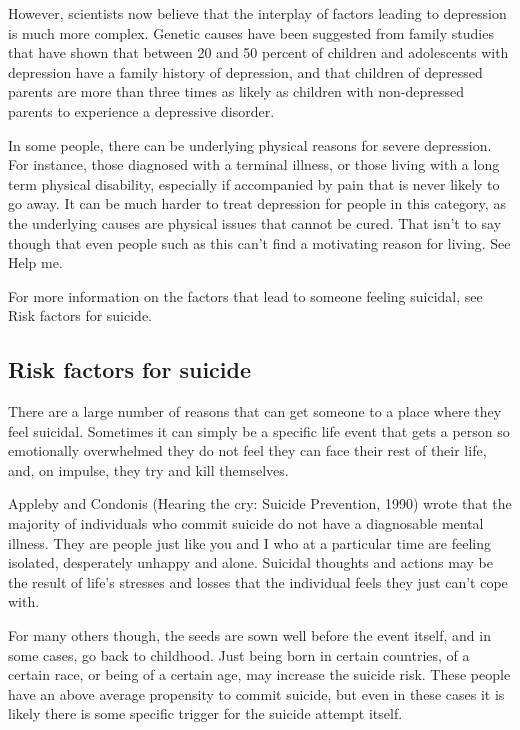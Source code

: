 \documentclass[12pt]{article}
\begin{document}
However, scientists now believe that the interplay of factors leading to depression is much more complex. Genetic causes have been suggested from family studies that have shown that between 20 and 50 percent of children and adolescents with depression have a family history of depression, and that children of depressed parents are more than three times as likely as children with non-depressed parents to experience a depressive disorder.

In some people, there can be underlying physical reasons for severe depression. For instance, those diagnosed with a terminal illness, or those living with a long term physical disability, especially if accompanied by pain that is never likely to go away. It can be much harder to treat depression for people in this category, as the underlying causes are physical issues that cannot be cured. That isn't to say though that even people such as this can't find a motivating reason for living. See Help me.

For more information on the factors that lead to someone feeling suicidal, see Risk factors for suicide.

\subsection{Risk factors for suicide}

There are a large number of reasons that can get someone to a place where they feel suicidal. Sometimes it can simply be a specific life event that gets a person so emotionally overwhelmed they do not feel they can face their rest of their life, and, on impulse, they try and kill themselves.

Appleby and Condonis (Hearing the cry: Suicide Prevention, 1990) wrote that the majority of individuals who commit suicide do not have a diagnosable mental illness. They are people just like you and I who at a particular time are feeling isolated, desperately unhappy and alone. Suicidal thoughts and actions may be the result of life's stresses and losses that the individual feels they just can't cope with.

For many others though, the seeds are sown well before the event itself, and in some cases, go back to childhood. Just being born in certain countries, of a certain race, or being of a certain age, may increase the suicide risk. These people have an above average propensity to commit suicide, but even in these cases it is likely there is some specific trigger for the suicide attempt itself.
\end{document}
